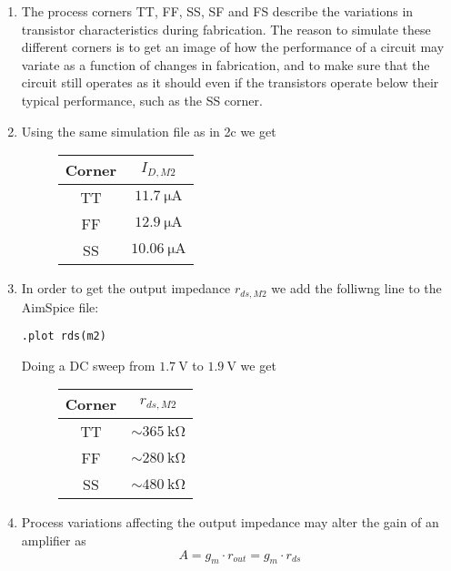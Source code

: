 \documentclass[a4paper,11pt,norsk]{article}
\begin{document}
\begin{enumerate}
\item
The process corners TT, FF, SS, SF and FS describe the variations in transistor characteristics 
during fabrication. The reason to simulate these different corners is to get an image of how 
the performance of a circuit may variate as a function of changes in fabrication, and to make sure that 
the circuit still operates as it should even if the transistors operate below their typical performance, 
such as the SS corner.

\item
Using the same simulation file as in 2c we get
\begin{figure}[H]
    \centering
    \begin{tabular}{|c|c|}
        \hline
        \textbf{Corner} & \textbf{$I_{D,M2}$} \\
        \hline
        TT & $\SI{11.7}{\micro\ampere}$ \\
        FF & $\SI{12.9}{\micro\ampere}$ \\
        SS & $\SI{10.06}{\micro\ampere}$ \\
        \hline
    \end{tabular}
\end{figure}

\item 
In order to get the output impedance $r_{ds,M2}$ we add the folliwng line to the AimSpice file:
\begin{tcolorbox}[colback=white!95!blue, title= AimSpice circuit file, colframe=gray!85!black]
\begin{verbatim}
.plot rds(m2)
\end{verbatim}
\end{tcolorbox}
Doing a DC sweep from $\SI{1.7}{\volt}$ to $\SI{1.9}{\volt}$ we get 
\begin{figure}[H]
    \centering
    \begin{tabular}{|c|c|}
        \hline
        \textbf{Corner} & \textbf{$r_{ds,M2}$} \\
        \hline
        TT & $\sim\SI{365}{\kilo\ohm}$ \\
        FF & $\sim\SI{280}{\kilo\ohm}$ \\
        SS & $\sim\SI{480}{\kilo\ohm}$ \\
        \hline
    \end{tabular}
\end{figure}

\item
Process variations affecting the output impedance may alter the gain of an amplifier as 
\[
    A = g_m \cdot r_{out} = g_m \cdot r_{ds}
\]

\end{enumerate}
\end{document}
